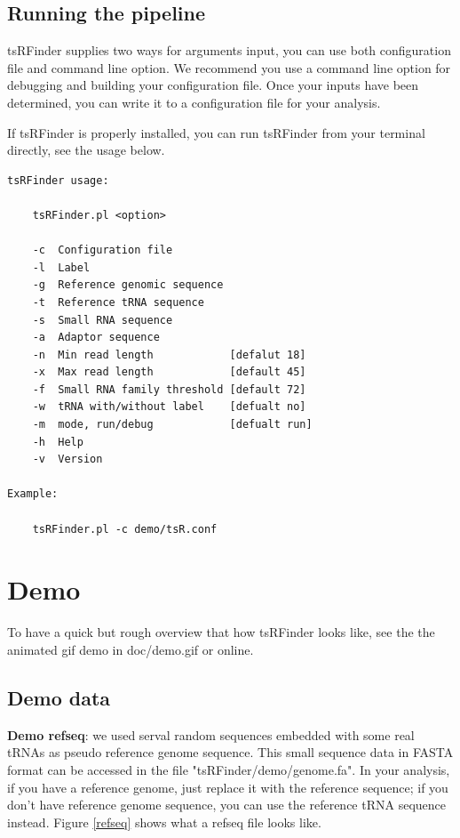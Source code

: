 \documentclass[11pt, a4paper]{article}
\begin{document}
\subsection{Running the pipeline}

tsRFinder supplies two ways for arguments input, you can use both configuration file and command line option. We recommend you use a command line option for debugging and building your configuration file. Once your inputs have been determined, you can write it to a configuration file for your analysis.

If tsRFinder is properly installed, you can run tsRFinder from your terminal directly, see the usage below.

{\small \begin{verbatim}
tsRFinder usage:

    tsRFinder.pl <option>

    -c  Configuration file
    -l  Label
    -g  Reference genomic sequence
    -t  Reference tRNA sequence
    -s  Small RNA sequence
    -a  Adaptor sequence
    -n  Min read length            [defalut 18]
    -x  Max read length            [default 45]
    -f  Small RNA family threshold [default 72]
    -w  tRNA with/without label    [defualt no]
    -m  mode, run/debug            [defualt run]
    -h  Help
    -v  Version

Example:

    tsRFinder.pl -c demo/tsR.conf
\end{verbatim}}

\section{Demo}

To have a quick but rough overview that how tsRFinder looks like, see the the animated gif demo in doc/demo.gif or online.

\subsection{Demo data}

\textbf{Demo refseq}: we used serval random sequences embedded with some real tRNAs as pseudo reference genome sequence. This small sequence data in FASTA format can be accessed in the file "tsRFinder/demo/genome.fa". In your analysis, if you have a reference genome, just replace it with the reference sequence; if you don't have reference genome sequence, you can use the reference tRNA sequence instead. Figure \ref{refseq} shows what a refseq file looks like.
\end{document}

